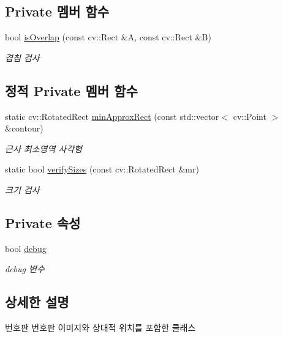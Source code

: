 \subsection*{Private 멤버 함수}
\begin{DoxyCompactItemize}
\item 
bool \hyperlink{class_plate_afffe9775bd49995e5ae87f6880af96d4}{is\+Overlap} (const cv\+::\+Rect \&A, const cv\+::\+Rect \&B)
\begin{DoxyCompactList}\small\item\em 겹침 검사 \end{DoxyCompactList}\end{DoxyCompactItemize}
\subsection*{정적 Private 멤버 함수}
\begin{DoxyCompactItemize}
\item 
static cv\+::\+Rotated\+Rect \hyperlink{class_plate_a2c048194ebdfbaeede0068dcbefbd4cf}{min\+Approx\+Rect} (const std\+::vector$<$ cv\+::\+Point $>$ \&contour)
\begin{DoxyCompactList}\small\item\em 근사 최소영역 사각형 \end{DoxyCompactList}\item 
static bool \hyperlink{class_plate_aac540b998a54ebd6a50173d5589edca5}{verify\+Sizes} (const cv\+::\+Rotated\+Rect \&mr)
\begin{DoxyCompactList}\small\item\em 크기 검사 \end{DoxyCompactList}\end{DoxyCompactItemize}
\subsection*{Private 속성}
\begin{DoxyCompactItemize}
\item 
\mbox{\label{class_plate_a4a417008bf85e65e2aed473f09f96b61}} 
bool \hyperlink{class_plate_a4a417008bf85e65e2aed473f09f96b61}{debug}
\begin{DoxyCompactList}\small\item\em debug 변수 \end{DoxyCompactList}\end{DoxyCompactItemize}


\subsection{상세한 설명}
번호판 번호판 이미지와 상대적 위치를 포함한 클래스 

